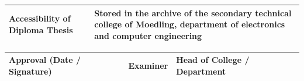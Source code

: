\vspace{10pt}

\noindent
\begin{tabular}{|m{}|m{}|}
\hline
Accessibility of \newline Diploma Thesis & Stored in the archive of the secondary technical college of Moedling, department of electronics and computer engineering \\
\hline
\end{tabular}

\vspace{10pt}

\noindent
\begin{tabular}{|m{}|m{}|m{}|}
\hline
Approval (Date / Signature) &
 {\tiny Examiner \newline \newline} \vspace{30pt} &
  {\tiny Head of College / Department \newline \newline} \vspace{30pt} \\
\hline
\end{tabular}